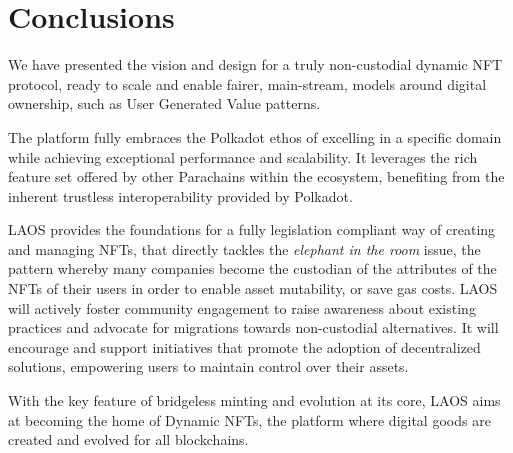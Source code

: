 \section{Conclusions} \label{conclusion}

We have presented the vision and design for a truly non-custodial
dynamic NFT protocol, ready to scale and enable fairer, main-stream,
models around digital ownership, 
such as User Generated Value patterns.

The platform fully embraces the Polkadot ethos of
excelling in a specific domain while achieving
exceptional performance and scalability.
It leverages the rich feature set
offered by other Parachains within the ecosystem,
benefiting from the inherent trustless interoperability
provided by Polkadot.

LAOS provides the foundations for a fully legislation compliant 
way of creating and managing NFTs, that directly tackles the {\it elephant
in the room} issue, the pattern whereby many companies become the custodian
of the attributes of the NFTs of their users in order to enable asset mutability, or save 
gas costs. LAOS will actively foster community engagement
to raise awareness about existing practices and advocate
for migrations towards non-custodial alternatives.
It will encourage and support initiatives that promote
the adoption of decentralized solutions,
empowering users to maintain control over their assets.

With the key feature of bridgeless minting and evolution at its core,
LAOS aims at becoming the home of Dynamic NFTs, the platform
where digital goods are created and evolved for all blockchains.







